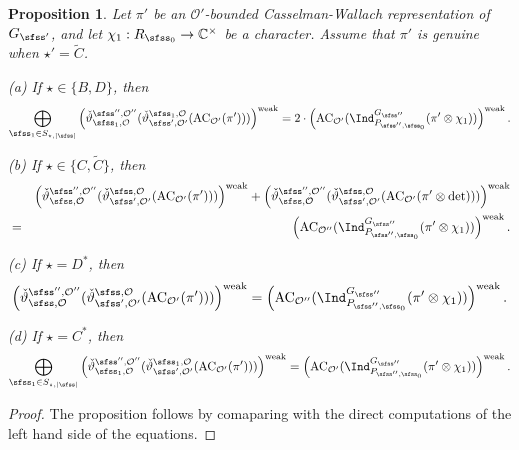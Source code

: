 \documentclass[12pt,a4paper]{amsart}
\def\abs#1{\left|{#1}\right|}
\newcommand{\CO}{{\mathcal {O}}}
\numberwithin{equation}{section}
\newtheorem{prop}[thm]{Proposition}
\theoremstyle{remark}
\begin{document}
\begin{prop}\label{prpaseq}
Let   $\pi'$ be an $\CO'$-bounded Casselman-Wallach representation of $G_{\sfss'}$, and let $\chi_1: R_{\sfss_0}\rightarrow \C^\times$ be a character. 
Assume that $\pi'$ is genuine when $\star'=\widetilde C$. 

\noindent
(a) If $ \star\in \{B,D\}$,  then
\[
    \bigoplus_{\sfss_1\in S_{\star, \abs{\sfss}}}  \left(\check \vartheta^{\sfss'', \CO''}_{\sfss_1, \CO}(\check \vartheta^{\sfss_1, \CO}_{\sfss',\CO'}(\mathrm{AC}_{\CO'}(\pi')))\right)^{\mathrm{weak}}=2\cdot \left( \mathrm{AC}_{\CO'}(\Ind_{P_{\sfss'',\sfss_0}}^{G_{\sfss''}} (\pi'\otimes \chi_1))\right)^{\mathrm{weak}}.
        \]

  \smallskip
  

    \noindent
(b) If $\star \in \{C, \widetilde C\}$, then
\begin{eqnarray*}
   && \left(\check \vartheta^{\sfss'', \CO''}_{\sfss, \CO}(\check \vartheta^{\sfss, \CO}_{\sfss',\CO'}(\mathrm{AC}_{\CO'}(\pi')))\right)^{\mathrm{weak}} +  \left(\check \vartheta^{\sfss'', \CO''}_{\sfss, \CO}(\check \vartheta^{\sfss, \CO}_{\sfss',\CO'}(\mathrm{AC}_{\CO'}(\pi'\otimes \det )))\right)^{\mathrm{weak}}\\
   & =&\left( \mathrm{AC}_{\CO''}(\Ind_{P_{\sfss'',\sfss_0}}^{G_{\sfss''}} (\pi'\otimes \chi_1))\right)^{\mathrm{weak}}. 
\end{eqnarray*}
  \smallskip

\noindent
(c) If $\star=D^*$, then
\[
 \left(\check \vartheta^{\sfss'', \CO''}_{\sfss, \CO}(\check \vartheta^{\sfss, \CO}_{\sfss',\CO'}(\mathrm{AC}_{\CO'}(\pi')))\right)^{\mathrm{weak}} = \left( \mathrm{AC}_{\CO''}(\Ind_{P_{\sfss'',\sfss_0}}^{G_{\sfss''}} (\pi'\otimes \chi_1))\right)^{\mathrm{weak}}.
 \]
 
\smallskip

\noindent
(d) If $\star=C^*$, then 
\[
  \bigoplus_{\sfss_1\in S_{\star, \abs{\sfss}} } \left(\check \vartheta^{\sfss'', \CO''}_{\sfss_1, \CO}(\check \vartheta^{\sfss_1, \CO}_{\sfss',\CO'}(\mathrm{AC}_{\CO'}(\pi')))\right)^{\mathrm{weak}}=\left( \mathrm{AC}_{\CO'}(\Ind_{P_{\sfss'',\sfss_0}}^{G_{\sfss''}} (\pi'\otimes \chi_1))\right)^{\mathrm{weak}}.
\]
\end{prop}
\begin{proof}
  The proposition follows by comaparing  with the direct computations of the left hand side of the equations.
\end{proof}
\end{document}
